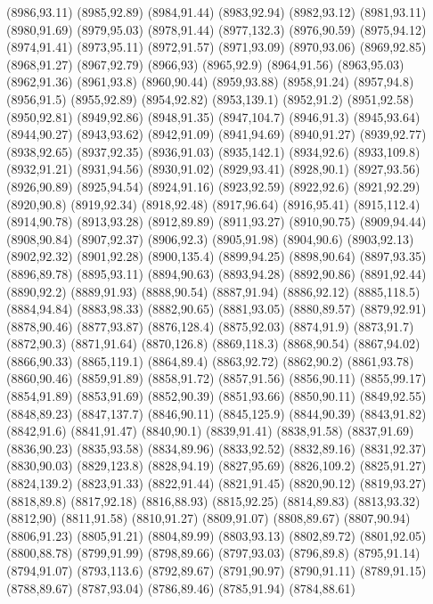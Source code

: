 (8986,93.11)
(8985,92.89)
(8984,91.44)
(8983,92.94)
(8982,93.12)
(8981,93.11)
(8980,91.69)
(8979,95.03)
(8978,91.44)
(8977,132.3)
(8976,90.59)
(8975,94.12)
(8974,91.41)
(8973,95.11)
(8972,91.57)
(8971,93.09)
(8970,93.06)
(8969,92.85)
(8968,91.27)
(8967,92.79)
(8966,93)
(8965,92.9)
(8964,91.56)
(8963,95.03)
(8962,91.36)
(8961,93.8)
(8960,90.44)
(8959,93.88)
(8958,91.24)
(8957,94.8)
(8956,91.5)
(8955,92.89)
(8954,92.82)
(8953,139.1)
(8952,91.2)
(8951,92.58)
(8950,92.81)
(8949,92.86)
(8948,91.35)
(8947,104.7)
(8946,91.3)
(8945,93.64)
(8944,90.27)
(8943,93.62)
(8942,91.09)
(8941,94.69)
(8940,91.27)
(8939,92.77)
(8938,92.65)
(8937,92.35)
(8936,91.03)
(8935,142.1)
(8934,92.6)
(8933,109.8)
(8932,91.21)
(8931,94.56)
(8930,91.02)
(8929,93.41)
(8928,90.1)
(8927,93.56)
(8926,90.89)
(8925,94.54)
(8924,91.16)
(8923,92.59)
(8922,92.6)
(8921,92.29)
(8920,90.8)
(8919,92.34)
(8918,92.48)
(8917,96.64)
(8916,95.41)
(8915,112.4)
(8914,90.78)
(8913,93.28)
(8912,89.89)
(8911,93.27)
(8910,90.75)
(8909,94.44)
(8908,90.84)
(8907,92.37)
(8906,92.3)
(8905,91.98)
(8904,90.6)
(8903,92.13)
(8902,92.32)
(8901,92.28)
(8900,135.4)
(8899,94.25)
(8898,90.64)
(8897,93.35)
(8896,89.78)
(8895,93.11)
(8894,90.63)
(8893,94.28)
(8892,90.86)
(8891,92.44)
(8890,92.2)
(8889,91.93)
(8888,90.54)
(8887,91.94)
(8886,92.12)
(8885,118.5)
(8884,94.84)
(8883,98.33)
(8882,90.65)
(8881,93.05)
(8880,89.57)
(8879,92.91)
(8878,90.46)
(8877,93.87)
(8876,128.4)
(8875,92.03)
(8874,91.9)
(8873,91.7)
(8872,90.3)
(8871,91.64)
(8870,126.8)
(8869,118.3)
(8868,90.54)
(8867,94.02)
(8866,90.33)
(8865,119.1)
(8864,89.4)
(8863,92.72)
(8862,90.2)
(8861,93.78)
(8860,90.46)
(8859,91.89)
(8858,91.72)
(8857,91.56)
(8856,90.11)
(8855,99.17)
(8854,91.89)
(8853,91.69)
(8852,90.39)
(8851,93.66)
(8850,90.11)
(8849,92.55)
(8848,89.23)
(8847,137.7)
(8846,90.11)
(8845,125.9)
(8844,90.39)
(8843,91.82)
(8842,91.6)
(8841,91.47)
(8840,90.1)
(8839,91.41)
(8838,91.58)
(8837,91.69)
(8836,90.23)
(8835,93.58)
(8834,89.96)
(8833,92.52)
(8832,89.16)
(8831,92.37)
(8830,90.03)
(8829,123.8)
(8828,94.19)
(8827,95.69)
(8826,109.2)
(8825,91.27)
(8824,139.2)
(8823,91.33)
(8822,91.44)
(8821,91.45)
(8820,90.12)
(8819,93.27)
(8818,89.8)
(8817,92.18)
(8816,88.93)
(8815,92.25)
(8814,89.83)
(8813,93.32)
(8812,90)
(8811,91.58)
(8810,91.27)
(8809,91.07)
(8808,89.67)
(8807,90.94)
(8806,91.23)
(8805,91.21)
(8804,89.99)
(8803,93.13)
(8802,89.72)
(8801,92.05)
(8800,88.78)
(8799,91.99)
(8798,89.66)
(8797,93.03)
(8796,89.8)
(8795,91.14)
(8794,91.07)
(8793,113.6)
(8792,89.67)
(8791,90.97)
(8790,91.11)
(8789,91.15)
(8788,89.67)
(8787,93.04)
(8786,89.46)
(8785,91.94)
(8784,88.61)
